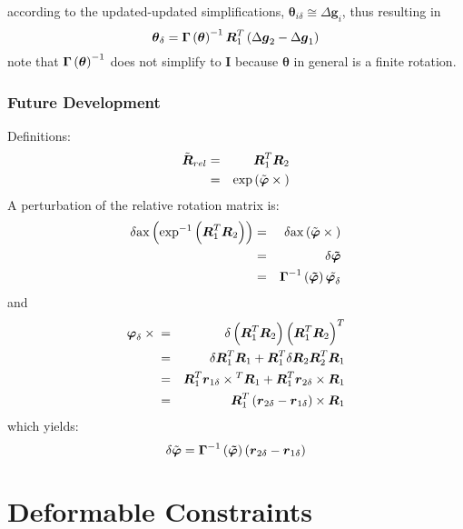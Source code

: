 \documentclass[10pt,dvips]{report}
\newcommand{\T}[1]{\boldsymbol{#1}}
\begin{document}
according to the updated-updated simplifications,
$\T{\theta}_{i\delta}\cong\Delta\T{g}_i$, thus resulting in
\begin{displaymath}
	\T{\theta}_{\delta} = \T{\Gamma}\plbr{\T{\theta}}^{-1} \T{R}_1^T \plbr{
		\Delta\T{g}_2 - \Delta\T{g}_1
	}
\end{displaymath}
note that $\T{\Gamma}\plbr{\T{\theta}}^{-1}$ does not simplify to $\T{I}$
because $\T{\theta}$ in general is a finite rotation.





\subsubsection{Future Development}
Definitions:
\begin{eqnarray*}
	\tilde{\T{R}}_{rel} & = & \T{R}_1^T \T{R}_2 \\
		& = & \llk{exp}\plbr{\tilde{\T{\varphi}}\times{}}
\end{eqnarray*}
A perturbation of the relative rotation matrix is:
\begin{eqnarray*}
	\delta\llk{ax}\plbr{\exp^{-1}\plbr{\T{R}_1^T \T{R}_2}}
		& = & \delta\llk{ax}\plbr{\tilde{\T{\varphi}}\times{}} \\
		& = & \delta\T{\tilde{\varphi}} \\
		& = & \T{\Gamma}^{-1}\plbr{\T{\tilde{\varphi}}}
			\tilde{\T{\varphi}_{\delta}}
\end{eqnarray*}
and
\begin{eqnarray*}
	\T{\varphi}_{\delta}\times{}
		& = & \delta\plbr{\T{R}_1^T \T{R}_2} \plbr{\T{R}_1^T \T{R}_2}^T \\
		& = & \delta\T{R}_1^T \T{R}_1
			+ \T{R}_1^T \delta\T{R}_2 \T{R}_2^T \T{R}_1 \\
		& = & \T{R}_1^T \T{r}_{1\delta}\times{}^T \T{R}_1
			+ \T{R}_1^T \T{r}_{2\delta}\times{} \T{R}_1 \\
		& = & \T{R}_1^T
			\plbr{\T{r}_{2\delta} - \T{r}_{1\delta}}\times{}
			\T{R}_1
\end{eqnarray*}
which yields:
\begin{displaymath}
	\delta\tilde{\T{\varphi}} = \T{\Gamma}^{-1}\plbr{\T{\tilde{\varphi}}}
		\plbr{\T{r}_{2\delta} - \T{r}_{1\delta}}	
\end{displaymath}


\section{Deformable Constraints}
\end{document}
